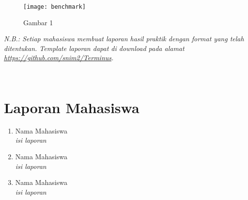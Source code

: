 \documentclass[a4paper]{tufte-handout}
\begin{document}
\begin{figure}
\texttt{[image: benchmark]}
\caption{Gambar 1}
\label{gam:gambar}
\end{figure}


\hrulefill

\newpage
{}
\textit{N.B.: Setiap mahasiswa membuat laporan hasil praktik dengan format yang telah ditentukan. Template laporan dapat di download pada alamat \url{https://github.com/snim2/Terminus}.}

 \\

\section{Laporan Mahasiswa}
\begin{enumerate}
\item Nama Mahasiswa \\
\textit{isi laporan}
\item Nama Mahasiswa \\
\textit{isi laporan}
\item Nama Mahasiswa \\
\textit{isi laporan}
\end{enumerate}


\hrulefill

\newpage


\end{document}
